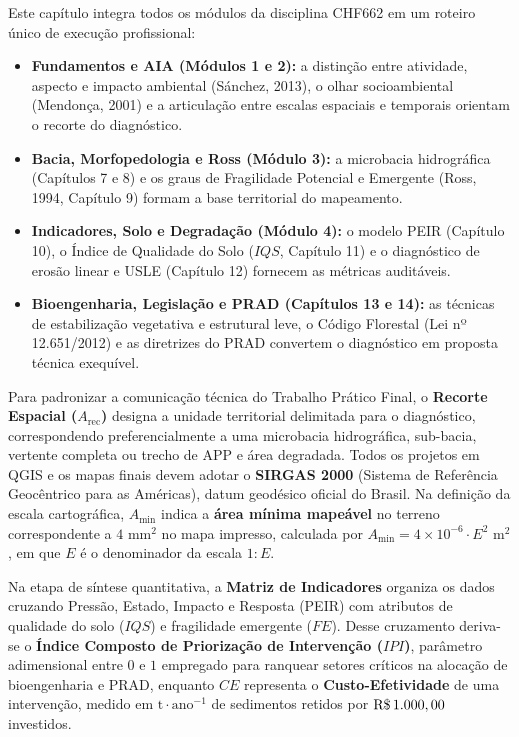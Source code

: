 \begin{capRevisao}
Este capítulo integra todos os módulos da disciplina CHF662 em um roteiro único de execução profissional:
\begin{itemize}[leftmargin=1.5em, itemsep=2.5pt]
  \item \textbf{Fundamentos e AIA (Módulos 1 e 2):} a distinção entre atividade, aspecto e impacto ambiental (Sánchez, 2013), o olhar socioambiental (Mendonça, 2001) e a articulação entre escalas espaciais e temporais orientam o recorte do diagnóstico.
  \item \textbf{Bacia, Morfopedologia e Ross (Módulo 3):} a microbacia hidrográfica (Capítulos 7 e 8) e os graus de Fragilidade Potencial e Emergente (Ross, 1994, Capítulo 9) formam a base territorial do mapeamento.
  \item \textbf{Indicadores, Solo e Degradação (Módulo 4):} o modelo PEIR (Capítulo 10), o Índice de Qualidade do Solo ($IQS$, Capítulo 11) e o diagnóstico de erosão linear e USLE (Capítulo 12) fornecem as métricas auditáveis.
  \item \textbf{Bioengenharia, Legislação e PRAD (Capítulos 13 e 14):} as técnicas de estabilização vegetativa e estrutural leve, o Código Florestal (Lei nº 12.651/2012) e as diretrizes do PRAD convertem o diagnóstico em proposta técnica exequível.
\end{itemize}
\end{capRevisao}


\begin{boxSimbolo}
Para padronizar a comunicação técnica do Trabalho Prático Final, o \textbf{Recorte Espacial ($A_{\text{rec}}$)} designa a unidade territorial delimitada para o diagnóstico, correspondendo preferencialmente a uma microbacia hidrográfica, sub-bacia, vertente completa ou trecho de APP e área degradada. Todos os projetos em QGIS e os mapas finais devem adotar o \textbf{SIRGAS 2000} (Sistema de Referência Geocêntrico para as Américas), datum geodésico oficial do Brasil. Na definição da escala cartográfica, $A_{\min}$ indica a \textbf{área mínima mapeável} no terreno correspondente a $4\text{ mm}^2$ no mapa impresso, calculada por $A_{\min} = 4 \times 10^{-6} \cdot E^2\text{ m}^2$, em que $E$ é o denominador da escala $1:E$.

Na etapa de síntese quantitativa, a \textbf{Matriz de Indicadores} organiza os dados cruzando Pressão, Estado, Impacto e Resposta (PEIR) com atributos de qualidade do solo ($IQS$) e fragilidade emergente ($FE$). Desse cruzamento deriva-se o \textbf{Índice Composto de Priorização de Intervenção ($IPI$)}, parâmetro adimensional entre $0$ e $1$ empregado para ranquear setores críticos na alocação de bioengenharia e PRAD, enquanto $CE$ representa o \textbf{Custo-Efetividade} de uma intervenção, medido em $\text{t}\cdot\text{ano}^{-1}$ de sedimentos retidos por $\text{R\$\,}{1.000,00}$ investidos.
\end{boxSimbolo}

